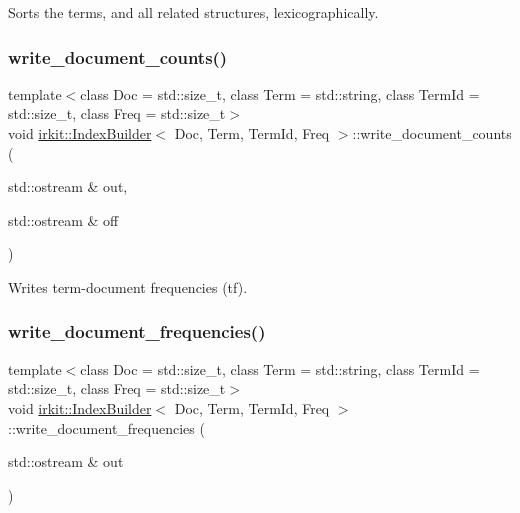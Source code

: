 Sorts the terms, and all related structures, lexicographically. 

\mbox{\label{classirkit_1_1IndexBuilder_aba0b947f29e491205adf3df3f862e58e}} 
\subsubsection{\texorpdfstring{write\+\_\+document\+\_\+counts()}{write\_document\_counts()}}
{\footnotesize\ttfamily template$<$class Doc  = std\+::size\+\_\+t, class Term  = std\+::string, class Term\+Id  = std\+::size\+\_\+t, class Freq  = std\+::size\+\_\+t$>$ \\
void \hyperlink{classirkit_1_1IndexBuilder}{irkit\+::\+Index\+Builder}$<$ Doc, Term, Term\+Id, Freq $>$\+::write\+\_\+document\+\_\+counts (\begin{DoxyParamCaption}\item[{std\+::ostream \&}]{out,  }\item[{std\+::ostream \&}]{off }\end{DoxyParamCaption})\hspace{0.3cm}{\ttfamily [inline]}}



Writes term-\/document frequencies (tf). 

\mbox{\label{classirkit_1_1IndexBuilder_a57c15d23588f70b78b49a6392ef61be8}} 
\subsubsection{\texorpdfstring{write\+\_\+document\+\_\+frequencies()}{write\_document\_frequencies()}}
{\footnotesize\ttfamily template$<$class Doc  = std\+::size\+\_\+t, class Term  = std\+::string, class Term\+Id  = std\+::size\+\_\+t, class Freq  = std\+::size\+\_\+t$>$ \\
void \hyperlink{classirkit_1_1IndexBuilder}{irkit\+::\+Index\+Builder}$<$ Doc, Term, Term\+Id, Freq $>$\+::write\+\_\+document\+\_\+frequencies (\begin{DoxyParamCaption}\item[{std\+::ostream \&}]{out }\end{DoxyParamCaption})\hspace{0.3cm}{\ttfamily [inline]}}



